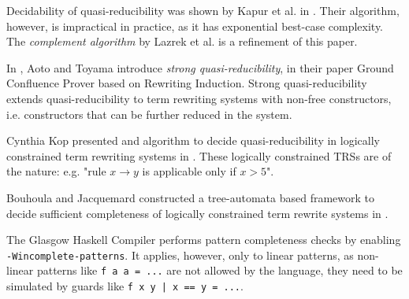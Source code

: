 Decidability of quasi-reducibility was shown by Kapur et al. in \cite{kapur}. Their algorithm, however, is impractical in practice, as it has exponential best-case complexity. The \textit{complement algorithm} by Lazrek et al. is a refinement of this paper.

In \cite{aoto}, Aoto and Toyama introduce \textit{strong quasi-reducibility}, in their paper Ground Confluence Prover based on Rewriting Induction. Strong quasi-reducibility extends quasi-reducibility to term rewriting systems with non-free constructors, i.e. constructors that can be further reduced in the system.

Cynthia Kop presented and algorithm to decide quasi-reducibility in logically constrained term rewriting systems in \cite{cynthia}. These logically constrained TRSs are of the nature: e.g. "rule $x \rightarrow y$ is applicable only if $x > 5$".

Bouhoula and Jacquemard constructed a tree-automata based framework to decide sufficient completeness of logically constrained term rewrite systems in \cite{bouhoula}.

The Glasgow Haskell Compiler \cite{ghc} performs pattern completeness checks by enabling \texttt{-Wincomplete-patterns}. It applies, however, only to linear patterns, as non-linear patterns like \texttt{f a a = ...} are not allowed by the language, they need to be simulated by guards like \texttt{f x y | x == y = ...}.

